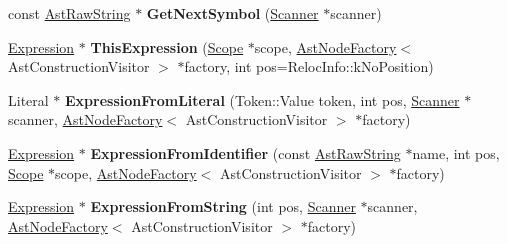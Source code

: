 \begin{DoxyCompactItemize}
\item 
\hypertarget{classv8_1_1internal_1_1_parser_traits_a56c2c6fcc416e624da608f611cb22821}{}const \hyperlink{classv8_1_1internal_1_1_ast_raw_string}{Ast\+Raw\+String} $\ast$ {\bfseries Get\+Next\+Symbol} (\hyperlink{classv8_1_1internal_1_1_scanner}{Scanner} $\ast$scanner)\label{classv8_1_1internal_1_1_parser_traits_a56c2c6fcc416e624da608f611cb22821}

\item 
\hypertarget{classv8_1_1internal_1_1_parser_traits_a794943d8b9b0711d8c28c00fbf226dbf}{}\hyperlink{classv8_1_1internal_1_1_expression}{Expression} $\ast$ {\bfseries This\+Expression} (\hyperlink{classv8_1_1internal_1_1_scope}{Scope} $\ast$scope, \hyperlink{classv8_1_1internal_1_1_ast_node_factory}{Ast\+Node\+Factory}$<$ Ast\+Construction\+Visitor $>$ $\ast$factory, int pos=Reloc\+Info\+::k\+No\+Position)\label{classv8_1_1internal_1_1_parser_traits_a794943d8b9b0711d8c28c00fbf226dbf}

\item 
\hypertarget{classv8_1_1internal_1_1_parser_traits_aa611c4ae2c389da4c2982585e4ea2d5f}{}Literal $\ast$ {\bfseries Expression\+From\+Literal} (Token\+::\+Value token, int pos, \hyperlink{classv8_1_1internal_1_1_scanner}{Scanner} $\ast$scanner, \hyperlink{classv8_1_1internal_1_1_ast_node_factory}{Ast\+Node\+Factory}$<$ Ast\+Construction\+Visitor $>$ $\ast$factory)\label{classv8_1_1internal_1_1_parser_traits_aa611c4ae2c389da4c2982585e4ea2d5f}

\item 
\hypertarget{classv8_1_1internal_1_1_parser_traits_ab43a99d3208d4bd4cd07e3613242e538}{}\hyperlink{classv8_1_1internal_1_1_expression}{Expression} $\ast$ {\bfseries Expression\+From\+Identifier} (const \hyperlink{classv8_1_1internal_1_1_ast_raw_string}{Ast\+Raw\+String} $\ast$name, int pos, \hyperlink{classv8_1_1internal_1_1_scope}{Scope} $\ast$scope, \hyperlink{classv8_1_1internal_1_1_ast_node_factory}{Ast\+Node\+Factory}$<$ Ast\+Construction\+Visitor $>$ $\ast$factory)\label{classv8_1_1internal_1_1_parser_traits_ab43a99d3208d4bd4cd07e3613242e538}

\item 
\hypertarget{classv8_1_1internal_1_1_parser_traits_a4ef5507cd3f55d0a3852b3762b45b484}{}\hyperlink{classv8_1_1internal_1_1_expression}{Expression} $\ast$ {\bfseries Expression\+From\+String} (int pos, \hyperlink{classv8_1_1internal_1_1_scanner}{Scanner} $\ast$scanner, \hyperlink{classv8_1_1internal_1_1_ast_node_factory}{Ast\+Node\+Factory}$<$ Ast\+Construction\+Visitor $>$ $\ast$factory)\label{classv8_1_1internal_1_1_parser_traits_a4ef5507cd3f55d0a3852b3762b45b484}


\end{DoxyCompactItemize}
